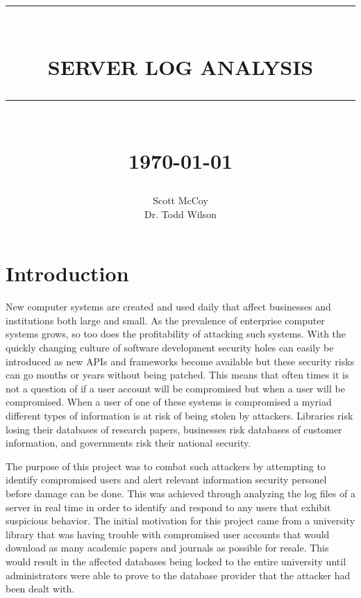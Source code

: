 \documentclass[12pt]{report}
\newcommand{\HRule}[1]{\rule{\linewidth}{#1}}
\begin{document}
\title{ \normalsize \textsc{}
        \\ [2.0cm]
        \HRule{0.5pt} \\
        \LARGE \textbf{\uppercase{Server Log Analysis}}
        \HRule{2pt} \\ [0.5cm]
        \normalsize \today \vspace*{5\baselineskip}}

\date{}

\author{
        Scott McCoy \\ 
        Dr. Todd Wilson\\
       	}

\maketitle


\sectionfont{\scshape}


\section*{Introduction}
	New computer systems are created and used daily that affect businesses and 
	institutions both large and small. As the prevalence of enterprise computer 
	systems grows, so too does the profitability of attacking such systems. With
	the quickly changing culture of software development security holes can easily be
	introduced as new APIs and frameworks become available but these security risks
	can go months or years without being patched. This means that often times it is not
	a question of if a user account will be compromised but when a user will be compromised.
	When a user of one of these systems is compromised a myriad different 
	types of information is at risk of being stolen by attackers. Libraries 
	risk losing their databases of research papers, businesses risk databases
	of customer information, and governments risk their national security.

	The purpose of this project was to combat such attackers by attempting to identify
	compromised users and alert relevant information security personel before damage 
	can be done. This was achieved through analyzing the log files of a server in real
	time in order to identify and respond to any users that exhibit suspicious behavior.
	The initial motivation for this project came from a university library that was having
	trouble with compromised user accounts that would download as many academic papers and 
	journals as possible for resale. This would result in the affected databases being locked 
	to the entire university until administrators were able to prove to the database provider 
	that the attacker had been dealt with.
\end{document}
